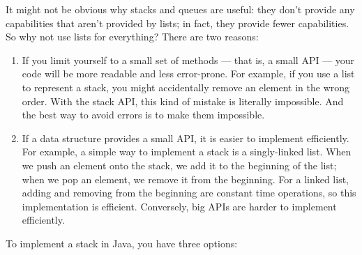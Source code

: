 \documentclass[12pt]{book}
\theoremstyle{exercise}
\newcommand{\java}{\verb}%}
\begin{document}

It might not be obvious why stacks and queues are useful: they don't
provide any capabilities that aren't provided by lists; in fact, they
provide fewer capabilities. So why not use lists for everything? There
are two reasons:

\begin{enumerate}

\item
  If you limit yourself to a small set of methods --- that is, a small
  API --- your code will be more readable and less error-prone. For
  example, if you use a list to represent a stack, you might
  accidentally remove an element in the wrong order. With the stack API,
  this kind of mistake is literally impossible. And the best way to
  avoid errors is to make them impossible.

\item
  If a data structure provides a small API, it is easier to implement
  efficiently. For example, a simple way to implement a stack is a
  singly-linked list. When we push an element onto the stack, we add it
  to the beginning of the list; when we pop an element, we remove it
  from the beginning. For a linked list, adding and removing from the
  beginning are constant time operations, so this implementation is
  efficient. Conversely, big APIs are harder to implement efficiently.

\end{enumerate}


To implement a stack in Java, you have three options:

\end{document}
